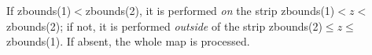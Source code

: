If zbounds(1)$<$zbounds(2), it is
performed {\em on} the strip zbounds(1)$<z<$zbounds(2); if not,
it is performed {\em outside} of the strip
zbounds(2)$\le z \le$zbounds(1). %
If absent, the whole map is processed.
